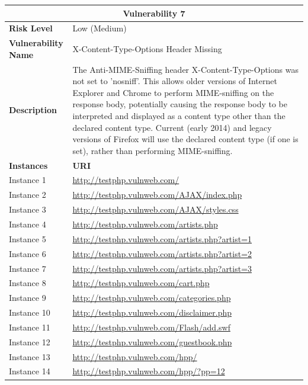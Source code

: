 \documentclass[12pt]{article}
\begin{document}
\begin{center}
\renewcommand{\arraystretch}{1.3}
\begin{longtable}{|l|p{10cm}|}
\hline
\multicolumn{2}{|c|}{\textbf{Vulnerability 7}} \\
\hline
\textbf{Risk Level} & Low (Medium) \\
\hline
\textbf{Vulnerability Name} & X-Content-Type-Options Header Missing \\
\hline
\textbf{Description} & The Anti-MIME-Sniffing header X-Content-Type-Options was not set to 'nosniff'. This allows older versions of Internet Explorer and Chrome to perform MIME-sniffing on the response body, potentially causing the response body to be interpreted and displayed as a content type other than the declared content type. Current (early 2014) and legacy versions of Firefox will use the declared content type (if one is set), rather than performing MIME-sniffing. \\
\hline
\textbf{Instances} & \textbf{URI} \\
\hline
Instance 1 & \url{http://testphp.vulnweb.com/} \\
\hline
Instance 2 & \url{http://testphp.vulnweb.com/AJAX/index.php} \\
\hline
Instance 3 & \url{http://testphp.vulnweb.com/AJAX/styles.css} \\
\hline
Instance 4 & \url{http://testphp.vulnweb.com/artists.php} \\
\hline
Instance 5 & \url{http://testphp.vulnweb.com/artists.php?artist=1} \\
\hline
Instance 6 & \url{http://testphp.vulnweb.com/artists.php?artist=2} \\
\hline
Instance 7 & \url{http://testphp.vulnweb.com/artists.php?artist=3} \\
\hline
Instance 8 & \url{http://testphp.vulnweb.com/cart.php} \\
\hline
Instance 9 & \url{http://testphp.vulnweb.com/categories.php} \\
\hline
Instance 10 & \url{http://testphp.vulnweb.com/disclaimer.php} \\
\hline
Instance 11 & \url{http://testphp.vulnweb.com/Flash/add.swf} \\
\hline
Instance 12 & \url{http://testphp.vulnweb.com/guestbook.php} \\
\hline
Instance 13 & \url{http://testphp.vulnweb.com/hpp/} \\
\hline
Instance 14 & \url{http://testphp.vulnweb.com/hpp/?pp=12} \\

\end{longtable}
\end{center}
\end{document}
